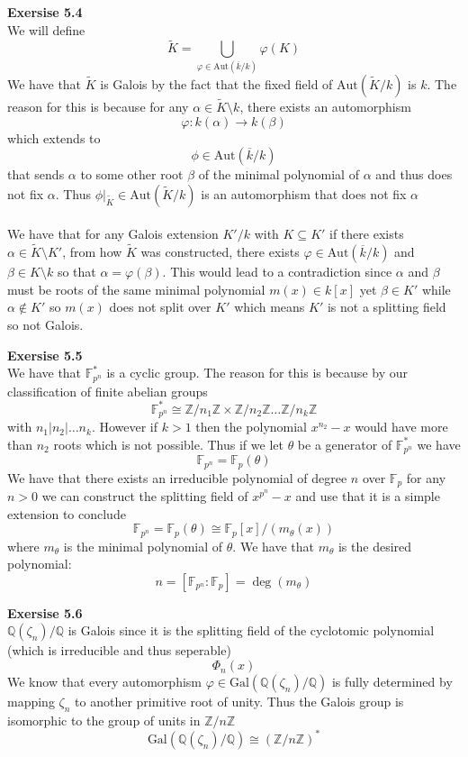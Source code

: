 \documentclass[12pt]{article}
\newenvironment{ques}[1]{\textbf{Exersise #1}\vspace{1 mm}\\ }{\bigskip}
\theoremstyle{definition}
\newcommand{\Q}{\mathbb Q}
\newcommand{\Z}{\mathbb Z}
\newcommand{\F}{\mathbb F}
\renewcommand{\a}{\alpha}
\renewcommand{\b}{\beta}
\newcommand{\Aut}{\text{Aut}}
\newcommand{\Gal}{\text{Gal}}
\begin{document}
\begin{ques}{5.4}
	We will define 
	$$\widetilde K = \bigcup_{\varphi \in \Aut(\overline k / k)} \varphi(K)$$
	We have that $\widetilde K$ is Galois by the fact that the fixed field of
	$\Aut(\widetilde K/k)$ is $k$. The reason for this is because for any $\a
	\in \widetilde K \setminus k$, there exists an automorphism
	$$\varphi:k(\a) \to k(\beta)$$
	which extends to
	$$\phi \in \Aut(\overline k/k)$$
	that sends $\a$ to some other root $\b$ of the minimal polynomial of $\a$ and
	thus does not fix $\a$. Thus $\phi|_{\widetilde K} \in \Aut(\widetilde
	K/k)$ is an automorphism that does not fix $\a$\\
	\\
	We have that for any Galois extension $K'/k$ with $K \subseteq K'$ if there
	exists $\a \in \widetilde K \setminus K'$, from how $\widetilde K$ was
	constructed, there exists $\varphi \in \Aut(\overline k/ k)$ and $\b \in K
	\setminus k$ so that $\a = \varphi(\b)$. This would lead to a contradiction
	since $\a$ and $\b$ must be roots of the same minimal polynomial $m(x) \in
	k[x]$ yet $\b \in K'$ while $\a \notin K'$ so $m(x)$ does not split over
	$K'$ which means $K'$ is not a splitting field so not Galois.
\end{ques}

\begin{ques}{5.5}
	We have that $\F_{p^n}^*$ is a cyclic group. The reason for this is because
	by our classification of finite abelian groups
	$$\F_{p^n}^* \cong \Z/n_1\Z \times \Z/n_2\Z \dots \Z/n_k\Z$$
	with $n_1|n_2|\dots n_k$. However if $k > 1$ then the polynomial $x^{n_2} -
	x$ would have more than $n_2$ roots which is not possible. Thus if we let
	$\theta$ be a generator of $\F_{p^n}^*$ we have 
	$$\F_{p^n} = \F_p(\theta)$$
	We have that there exists an irreducible polynomial of degree $n$ over
	$\F_p$ for any $n> 0$ we can construct the splitting field of $x^{p^n} - x$
	and use that it is a simple extension to conclude
	$$\F_{p^n} = \F_p(\theta) \cong \F_p[x]/(m_\theta(x))$$
	where $m_\theta$ is the minimal polynomial of $\theta$. We have that
	$m_\theta$ is the desired polynomial:
	$$n = [\F_{p^n}:\F_p] = \deg(m_\theta)$$
\end{ques}

\begin{ques}{5.6}
	$\Q(\zeta_n)/\Q$ is Galois since it is the splitting field of the
	cyclotomic polynomial (which is irreducible and thus seperable)
	$$\Phi_n(x)$$
	We know that every automorphism $\varphi \in \Gal(\Q(\zeta_n)/\Q)$ is fully
	determined by mapping $\zeta_n$ to another primitive root of unity. Thus
	the Galois group is isomorphic to the group of units in $\Z/n\Z$
	$$\Gal(\Q(\zeta_n)/\Q) \cong (\Z/n\Z)^*$$
\end{ques}
\end{document}
